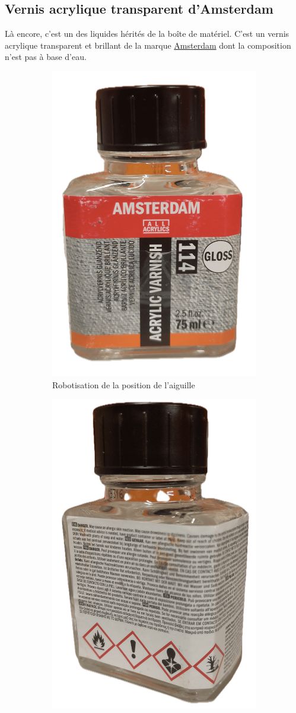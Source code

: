 \subsection{Vernis acrylique transparent d'Amsterdam}
Là encore, c'est un des liquides hérités de la boîte de matériel. C'est un vernis acrylique transparent et brillant de la marque \href{https://www.amsterdam-acrylics.com/fr/}{Amsterdam} dont la composition
n'est pas à base d'eau.
\begin{figure}[H]
    \centering
    \begin{subfigure}{.5\textwidth}
        \centering
        \includegraphics[width=0.6\linewidth]{assets/figures/etat_art/Amsterdam_vernis_acrylique.png}
        \caption{Robotisation de la position de l'aiguille}
        \label{fig:vernis_amsterdam_front}
    \end{subfigure}%
    \begin{subfigure}{.5\textwidth}
        \centering
        \includegraphics[width=0.6\linewidth]{assets/figures/etat_art/Amsterdam_vernis_acrylique_dos.png}

\end{subfigure}
\end{figure}
